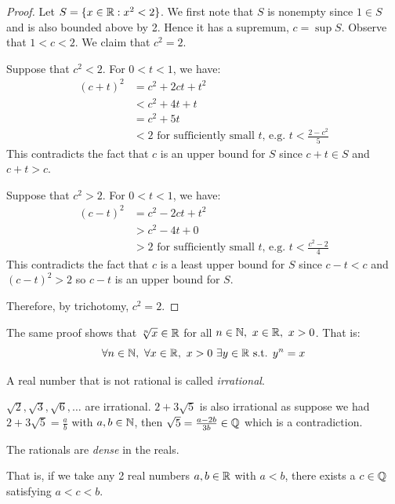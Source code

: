 \documentclass[../main.tex]{subfiles}
\begin{document}
\begin{proof}
  Let $S = \{ x \in \mathbb{R}: x^2 <2\}$.
  We first note that $S$ is nonempty since $1 \in S$ and is also bounded above by 2.
  Hence it has a supremum, $c = \sup S$.
  Observe that $1 < c < 2$.
  We claim that $c^2 = 2$.

  Suppose that $c^2 < 2$.
  For $0 < t < 1$, we have:
  \begin{align*}
    (c + t)^2 &= c^2 + 2ct + t^2 \\
              &< c^2 + 4t + t \\
              &= c^2 + 5t \\
              &< 2 \text{ for sufficiently small $t$, e.g. $t < \frac{2 - c^2}{5}$}
  \end{align*}
  This contradicts the fact that $c$ is an upper bound for $S$ since $c + t \in S$ and $c + t > c$.

  Suppose that $c^2 > 2$.
  For $0 < t < 1$, we have:
  \begin{align*}
    (c - t)^2 &= c^2 - 2ct + t^2 \\
              &> c^2 - 4t + 0 \\
              &> 2 \text{ for sufficiently small $t$, e.g. $t < \frac{c^2 - 2}{4}$}
  \end{align*}
  This contradicts the fact that $c$ is a least upper bound for $S$ since $c - t < c$ and $(c - t)^2 > 2$ so $c - t$ is an upper bound for $S$.

  Therefore, by trichotomy, $c^2 = 2$.
\end{proof}
\begin{remark}
  The same proof shows that $\sqrt[n]{x} \in \mathbb{R}$ for all $n \in \mathbb{N},\ x \in \mathbb{R},\ x > 0$.
  That is:
  \[
    \forall n \in \N,\ \forall x \in \R,\ x > 0\ \exists y \in \R \text{ s.t. } y^n = x
  \]
\end{remark}
\begin{definition}[Irrational]
  A real number that is not rational is called \textit{irrational}.
\end{definition}
\begin{example}
  $\sqrt{2}, \sqrt{3}, \sqrt{6}, \ldots$ are irrational.
  $2 + 3\sqrt{5}$ is also irrational as suppose we had $2  + 3 \sqrt{5} = \frac{a}{b}$ with $a, b \in \mathbb{N}$, then $\sqrt{5} = \frac{a - 2b}{3b} \in \mathbb{Q}$ which is a contradiction.
\end{example}
\begin{proposition}
  The rationals are \textit{dense} in the reals. \label{rationalsDense}

  That is, if we take any 2 real numbers $a, b \in \mathbb{R}$ with $a < b$, there exists a $c \in \mathbb{Q}$ satisfying $a < c < b$.
\end{proposition}
\end{document}
